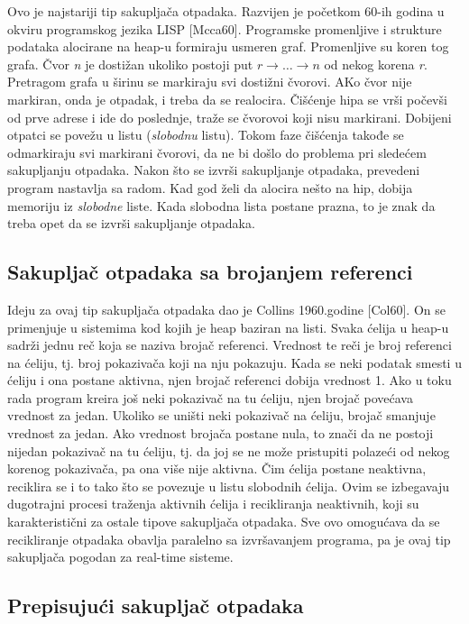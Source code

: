 Ovo je najstariji tip sakupljača otpadaka. Razvijen je početkom 60-ih godina u
okviru programskog jezika LISP [Mcca60].
Programske promenljive i strukture podataka alocirane na heap-u formiraju usmeren graf.
Promenljive su koren tog grafa.
Čvor \textit{n} je dostižan ukoliko postoji put $r\rightarrow \dots \rightarrow n$ od nekog korena \textit{r}.
Pretragom grafa u širinu se markiraju svi dostižni čvorovi.
AKo čvor nije markiran, onda je otpadak, i treba da se realocira.
Čišćenje hipa se vrši počevši od prve adrese i ide do poslednje, traže se čvorovoi koji nisu markirani.
Dobijeni otpatci se povežu u listu (\textit{slobodnu} listu).
Tokom faze čišćenja takođe se odmarkiraju svi markirani čvorovi, da ne bi došlo do problema pri sledećem sakupljanju otpadaka.
Nakon što se izvrši sakupljanje otpadaka, prevedeni program nastavlja sa radom.
Kad god želi da alocira nešto na hip, dobija memoriju iz \textit{slobodne} liste. Kada slobodna lista postane prazna, to je znak da treba opet da se izvrši sakupljanje otpadaka.

\subsection{Sakupljač otpadaka sa brojanjem referenci}
\label{ref:reference counter}

Ideju za ovaj tip sakupljača otpadaka dao je Collins 1960.godine [Col60].
On se primenjuje u sistemima kod kojih je heap baziran na listi.
Svaka ćelija u heap-u sadrži jednu reč koja se naziva brojač referenci.
Vrednost te reči je broj referenci na ćeliju, tj. broj pokazivača koji na nju pokazuju.
Kada se neki podatak smesti u ćeliju i ona postane aktivna, njen brojač referenci dobija vrednost 1.
Ako u toku rada program kreira još neki pokazivač na tu ćeliju, njen brojač povećava vrednost za jedan.
Ukoliko se uništi neki pokazivač na ćeliju, brojač smanjuje vrednost za jedan.
Ako vrednost brojača postane nula, to znači da ne postoji nijedan pokazivač na tu ćeliju, tj. da joj se ne može pristupiti polazeći od nekog korenog pokazivača, pa ona više nije aktivna.
Čim ćelija postane neaktivna, reciklira se i to tako što se povezuje u listu slobodnih ćelija.
Ovim se izbegavaju dugotrajni procesi traženja aktivnih ćelija i recikliranja neaktivnih, koji su karakteristični za ostale tipove sakupljača otpadaka.
Sve ovo omogućava da se recikliranje otpadaka obavlja paralelno sa izvršavanjem programa, pa je ovaj tip sakupljača pogodan za real-time sisteme.

\subsection{Prepisujući sakupljač otpadaka}

